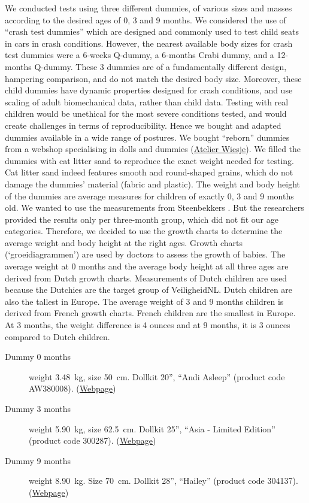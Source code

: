 \documentclass[a4paper]{article}
\begin{document}
We conducted tests using three different dummies, of various sizes and masses
according to the desired ages of 0, 3 and 9 months. We considered the use of
``crash test dummies'' which are designed and commonly used to test
child seats in cars in crash conditions. However, the nearest available body
sizes for crash test dummies were a 6-weeks Q-dummy, a 6-months Crabi dummy, and a
12-months Q-dummy. These 3 dummies are of a fundamentally different design,
hampering comparison, and do not match the desired body size. Moreover, these
child dummies have dynamic properties designed for crash conditions, and use
scaling of adult biomechanical data, rather than child data.
Testing with real children would be unethical for the most severe conditions
tested, and would create challenges in terms of reproducibility.
Hence we bought and adapted dummies available in a wide range of postures. We
bought ``reborn'' dummies from a webshop specialising in dolls and dummies
(\href{http://www.atelier-wiesje.nl}{Atelier Wiesje}). We filled the dummies
with cat litter sand to reproduce the exact weight needed for testing. Cat
litter sand indeed features smooth and round-shaped grains, which do not
damage the dummies' material (fabric and plastic). The weight and body height of
the dummies are average measures for children of exactly 0, 3 and 9 months old.
We wanted to use the measurements from Steenbekkers \cite{Steenbekkers1993}. But
the researchers provided the results only per three-month group, which did not fit our
age categories. Therefore, we decided to use the growth charts to determine the average weight
and body height at the right ages. Growth charts (`groeidiagrammen') are used by
doctors to assess the growth of babies. The average weight at 0 months and the
average body height at all three ages are derived from Dutch growth charts.
Measurements of Dutch children are used because the Dutchies are the target group of
VeiligheidNL. Dutch children are also the tallest in Europe. The average weight
of 3 and 9 months children is derived from French growth charts. French children
are the smallest in Europe. At 3 months, the weight difference is 4 ounces and
at 9 months, it is 3 ounces compared to Dutch children.  
%
\begin{description}
  \item[Dummy 0 months] weight 3.48~\si{\kg}, size 50~\si{\cm}. Dollkit 20'',
  ``Andi Asleep'' (product code AW380008).
  (\href{http://www.atelier-wiesje.nl/index.php?item=9912---dollkit-20-_-andi-asleep--_-armen-_-_-benen----available&action=article&group_id=10000164&aid=2163&lang=NL}{Webpage})
  \item[Dummy 3 months] weight 5.90~\si{\kg}, size 62.5~\si{\cm}. Dollkit 25'',
  ``Asia - Limited Edition'' (product code 300287).
  (\href{http://www.atelier-wiesje.nl/index.php?action=article&aid=2556&group_id=10000176&lang=NL}{Webpage})
  \item[Dummy 9 months] weight 8.90~\si{\kg}. Size 70~\si{\cm}. Dollkit 28'',
  ``Hailey'' (product code 304137).
  (\href{http://www.atelier-wiesje.nl/index.php?action=article&aid=1974&group_id=10000133&lang=NL}{Webpage})
\end{description}
\end{document}
